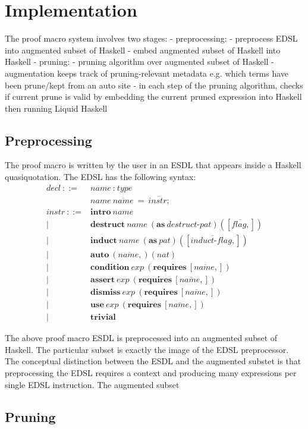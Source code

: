 \section{Implementation}

The proof macro system involves two stages:
- preprocessing:
  - preprocess EDSL into augmented subset of Haskell
  - embed augmented subset of Haskell into Haskell
- pruning:
  - pruning algorithm over augmented subset of Haskell 
    - augmentation keeps track of pruning-relevant metadata e.g. which terms have been prune/kept from an auto site
    - in each step of the pruning algorithm, checks if current prune is valid by embedding the current pruned expression into Haskell then running Liquid Haskell

\subsection{Preprocessing}

The proof macro is written by the user in an ESDL that appears inside a Haskell quasiquotation.
The EDSL has the following syntax:
\begin{align*}
  \textit{decl}~ ::= &
    \textit{name} ~ : ~ \textit{type} \\ &
    \textit{name} ~ \overline{\textit{name}} ~ = ~ \overline{\textit{instr} ; }
  \\
  \textit{instr} ~ ::= &
    \textbf{intro} ~ \textit{name} \\ | &
    \textbf{destruct} ~ \textit{name} ~ (\textbf{as} ~ \textit{destruct-pat}) ([\overline{\textit{flag},}]) \\ | &
    \textbf{induct} ~ \textit{name} ~ (\textbf{as} ~ \textit{pat}) ([\overline{\textit{induct-flag},}]) \\ | &
    \textbf{auto} ~ (\overline{\textit{name},}) (\textit{nat}) \\ | &
    \textbf{condition} ~ \textit{exp} ~ (\textbf{requires} ~ [\overline{\textit{name},}]) \\ | &
    \textbf{assert} ~ \textit{exp} ~ (\textbf{requires} ~ [\overline{\textit{name},}]) \\ | &
    \textbf{dismiss} ~ \textit{exp} ~ (\textbf{requires} ~ [\overline{\textit{name},}]) \\ | &
    \textbf{use} ~ \textit{exp} ~ (\textbf{requires} ~ [\overline{\textit{name},}]) \\ | &
    \textbf{trivial}
\end{align*}

The above proof macro ESDL is preprocessed into an augmented subset of Haskell. 
The particular subset is exactly the image of the EDSL preprocessor.
The conceptual distinction between the ESDL and the augmented substet is that preprocessing the EDSL requires a context and producing many expressions per single EDSL instruction. 
The augmented subset 

\subsection{Pruning}